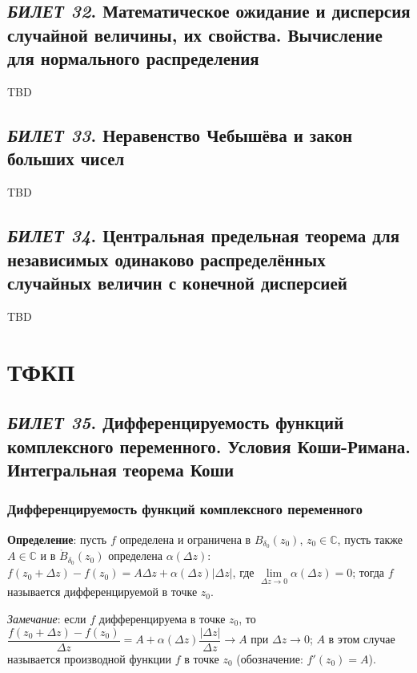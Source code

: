 \documentclass[12pt, a4paper, reqno]{article}
\begin{document}
\newpage
\subsection{\textit{БИЛЕТ 32}. Математическое ожидание и дисперсия случайной величины, их свойства.
            Вычисление для нормального распределения}

    TBD

\newpage
\subsection{\textit{БИЛЕТ 33}. Неравенство Чебышёва и закон больших чисел}

    TBD

\newpage
\subsection{\textit{БИЛЕТ 34}. Центральная предельная теорема для независимых одинаково распределённых
            случайных величин с конечной дисперсией}

    TBD

\newpage
\section{ТФКП}

\subsection{\textit{БИЛЕТ 35}. Дифференцируемость функций комплексного переменного.
            Условия Коши-Римана. Интегральная теорема Коши}

    \subsubsection{Дифференцируемость функций комплексного переменного}

    \textbf{Определение}: пусть $f$ определена и ограничена в $B_{\delta_0}(z_0)$, $z_0 \in \mathbb{C}$,
    пусть также $A \in \mathbb{C}$ и в $\mathring B_{\delta_0}(z_0)$ определена $\alpha(\Delta z)$:
    $f(z_0 + \Delta z) - f(z_0) = A \Delta z + \alpha(\Delta z)|\Delta z|$, где
    $\lim\limits_{\Delta z \to 0} \alpha(\Delta z) = 0$; тогда $f$ называется дифференцируемой в
    точке $z_0$.

    \textit{Замечание}: если $f$ дифференцируема в точке $z_0$, то
    $\dfrac{f(z_0 + \Delta z) - f(z_0)}{\Delta z} = A + \alpha(\Delta z)\dfrac{|\Delta z|}{\Delta z} \to A$
    при $\Delta z \to 0$; $A$ в этом случае называется производной функции $f$ в точке $z_0$
    (обозначение: $f'(z_0) = A$).
\end{document}
